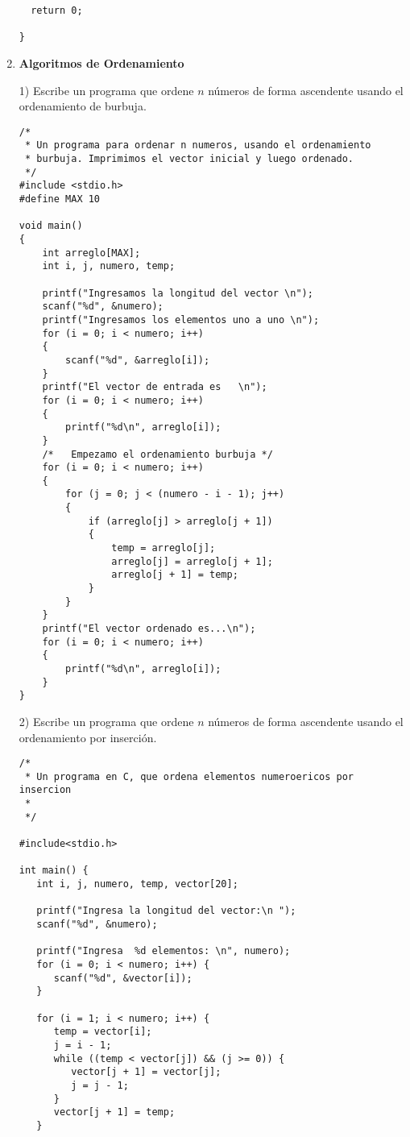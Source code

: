 \documentclass[twoside,10.5pt]{article}%
\begin{document}
\begin{enumerate}
\begin{verbatim}
  return 0;
  
}
\end{verbatim}

\item \textbf{Algoritmos de Ordenamiento}

1) Escribe un programa que ordene $n$ n\'umeros de forma ascendente usando el ordenamiento de burbuja.

\begin{verbatim}
/*
 * Un programa para ordenar n numeros, usando el ordenamiento
 * burbuja. Imprimimos el vector inicial y luego ordenado.
 */
#include <stdio.h>
#define MAX 10
 
void main()
{
    int arreglo[MAX];
    int i, j, numero, temp;
 
    printf("Ingresamos la longitud del vector \n");
    scanf("%d", &numero);
    printf("Ingresamos los elementos uno a uno \n");
    for (i = 0; i < numero; i++)
    {
        scanf("%d", &arreglo[i]);
    }
    printf("El vector de entrada es   \n");
    for (i = 0; i < numero; i++)
    {
        printf("%d\n", arreglo[i]);
    }
    /*   Empezamo el ordenamiento burbuja */
    for (i = 0; i < numero; i++)
    {
        for (j = 0; j < (numero - i - 1); j++)
        {
            if (arreglo[j] > arreglo[j + 1])
            {
                temp = arreglo[j];
                arreglo[j] = arreglo[j + 1];
                arreglo[j + 1] = temp;
            }
        }
    }
    printf("El vector ordenado es...\n");
    for (i = 0; i < numero; i++)
    {
        printf("%d\n", arreglo[i]);
    }
}
\end{verbatim}

2) Escribe un programa que ordene $n$ n\'umeros de forma ascendente usando el ordenamiento por inserci\'on.


\begin{verbatim}
/*
 * Un programa en C, que ordena elementos numeroericos por insercion 
 * 
 */

#include<stdio.h>

int main() {
   int i, j, numero, temp, vector[20];

   printf("Ingresa la longitud del vector:\n ");
   scanf("%d", &numero);

   printf("Ingresa  %d elementos: \n", numero);
   for (i = 0; i < numero; i++) {
      scanf("%d", &vector[i]);
   }

   for (i = 1; i < numero; i++) {
      temp = vector[i];
      j = i - 1;
      while ((temp < vector[j]) && (j >= 0)) {
         vector[j + 1] = vector[j];
         j = j - 1;
      }
      vector[j + 1] = temp;
   }


\end{verbatim}
\end{enumerate}
\end{document}

